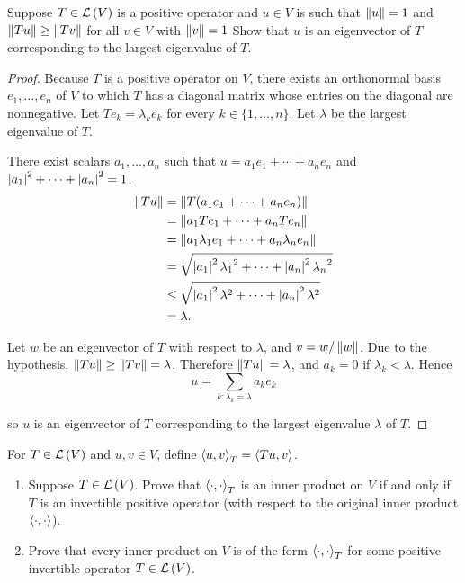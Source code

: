 \begin{exercise}
    Suppose $T \in \mathcal{L}\left({V}\right)$ is a positive operator and $u \in V$ is such that $\left\Vert{u}\right\Vert = 1$ and $\left\Vert{Tu}\right\Vert\geq \left\Vert{Tv}\right\Vert$ for all $v \in V$ with $\left\Vert{v}\right\Vert = 1$ Show that $u$ is an eigenvector of $T$ corresponding to the largest eigenvalue of $T$.
\end{exercise}

\begin{proof}
    Because $T$ is a positive operator on $V$, there exists an orthonormal basis $e_{1}, \ldots, e_{n}$ of $V$ to which $T$ has a diagonal matrix whose entries on the diagonal are nonnegative. Let $Te_{k} = \lambda_{k}e_{k}$ for every $k\in\{1,\ldots,n\}$. Let $\lambda$ be the largest eigenvalue of $T$.

    There exist scalars $a_{1}, \ldots, a_{n}$ such that $u = a_{1}e_{1} + \cdots + a_{n}e_{n}$ and $\left\vert{a_{1}}\right\vert^{2} + \cdots + \left\vert{a_{n}}\right\vert^{2} = 1$.
    \begin{align*}
        \left\Vert{Tu}\right\Vert & = \left\Vert{T(a_{1}e_{1} + \cdots + a_{n}e_{n})}\right\Vert                                          \\
                  & = \left\Vert{a_{1}Te_{1} + \cdots + a_{n}Te_{n}}\right\Vert                                           \\
                  & = \left\Vert{a_{1}\lambda_{1}e_{1} + \cdots + a_{n}\lambda_{n}e_{n}}\right\Vert                       \\
                  & = \sqrt{\left\vert{a_{1}}\right\vert^{2}{\lambda_{1}}^{2} + \cdots + \left\vert{a_{n}}\right\vert^{2}{\lambda_{n}}^{2}} \\
                  & \leq \sqrt{\left\vert{a_{1}}\right\vert^{2}{\lambda}^{2} + \cdots + \left\vert{a_{n}}\right\vert^{2}{\lambda}^{2}}      \\
                  & = \lambda.
    \end{align*}

    Let $w$ be an eigenvector of $T$ with respect to $\lambda$, and $v = w/\left\Vert{w}\right\Vert$. Due to the hypothesis, $\left\Vert{Tu}\right\Vert\geq \left\Vert{Tv}\right\Vert = \lambda$. Therefore $\left\Vert{Tu}\right\Vert = \lambda$, and $a_{k} = 0$ if $\lambda_{k} < \lambda$. Hence
    \[
        u = \sum_{k: \lambda_{k} = \lambda}a_{k}e_{k}
    \]

    so $u$ is an eigenvector of $T$ corresponding to the largest eigenvalue $\lambda$ of $T$.
\end{proof}
\newpage

\begin{exercise}
    For $T\in\mathcal{L}\left({V}\right)$ and $u, v\in V$, define ${\left\langle{u, v}\right\rangle}_{T} = \left\langle{Tu, v}\right\rangle$.
    \begin{enumerate}[label={(\alph*)}]
        \item Suppose $T\in\mathcal{L}\left({V}\right)$. Prove that ${\left\langle{\cdot,\cdot}\right\rangle}_{T}$ is an inner product on $V$ if and only if $T$ is an invertible positive operator (with respect to the original inner product $\left\langle{\cdot, \cdot}\right\rangle$).
        \item Prove that every inner product on $V$ is of the form ${\left\langle{\cdot, \cdot}\right\rangle}_{T}$ for some positive invertible operator $T\in\mathcal{L}\left({V}\right)$.
    \end{enumerate}
\end{exercise}

